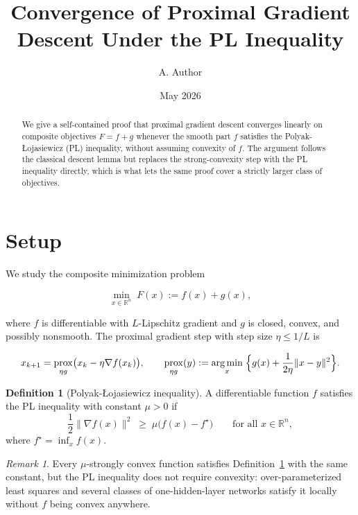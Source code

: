 \documentclass[11pt]{article}
\title{Convergence of Proximal Gradient Descent Under the PL Inequality}
\author{A. Author}
\date{May 2026}
\theoremstyle{definition}
\newtheorem{definition}[theorem]{Definition}
\theoremstyle{remark}
\newtheorem{remark}[theorem]{Remark}
\DeclareMathOperator{\prox}{prox}
\DeclareMathOperator*{\argmin}{arg\,min}
\begin{document}
\maketitle

\begin{abstract}
We give a self-contained proof that proximal gradient descent converges
linearly on composite objectives $F = f + g$ whenever the smooth part
$f$ satisfies the Polyak-{\L}ojasiewicz (PL) inequality, without
assuming convexity of $f$. The argument follows the classical descent
lemma but replaces the strong-convexity step with the PL inequality
directly, which is what lets the same proof cover a strictly larger
class of objectives.
\end{abstract}

\section{Setup}
\label{sec:setup}

We study the composite minimization problem

\begin{equation}
  \label{eq:objective}
  \min_{x \in \mathbb{R}^n} \; F(x) := f(x) + g(x),
\end{equation}

where $f$ is differentiable with $L$-Lipschitz gradient and $g$ is
closed, convex, and possibly nonsmooth. The proximal gradient step with
step size $\eta \le 1/L$ is

\begin{equation}
  \label{eq:pgd-step}
  x_{k+1} = \prox_{\eta g}\bigl(x_k - \eta \nabla f(x_k)\bigr),
  \qquad
  \prox_{\eta g}(y) := \argmin_{x} \; \Bigl\{ g(x) + \frac{1}{2\eta}\lVert x - y \rVert^2 \Bigr\}.
\end{equation}

\begin{definition}[Polyak-{\L}ojasiewicz inequality]
\label{def:pl}
A differentiable function $f$ satisfies the PL inequality with constant
$\mu > 0$ if
\begin{equation}
  \label{eq:pl}
  \frac{1}{2}\lVert \nabla f(x) \rVert^2 \;\ge\; \mu \bigl(f(x) - f^\star\bigr)
  \qquad \text{for all } x \in \mathbb{R}^n,
\end{equation}
where $f^\star = \inf_x f(x)$.
\end{definition}

\begin{remark}
Every $\mu$-strongly convex function satisfies Definition~\ref{def:pl}
with the same constant, but the PL inequality does not require
convexity: over-parameterized least squares and several classes of
one-hidden-layer networks satisfy it locally without $f$ being convex
anywhere.
\end{remark}
\end{document}
